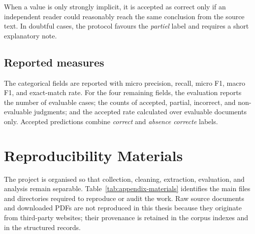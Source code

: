 \documentclass[
11pt,
english,
singlespacing,
headsepline,
]{MastersDoctoralThesis}
\begin{document}
When a value is only strongly implicit, it is accepted as correct only if an
independent reader could reasonably reach the same conclusion from the source
text. In doubtful cases, the protocol favours the \textit{partiel} label and
requires a short explanatory note.

\section{Reported measures}

The categorical fields are reported with micro precision, recall, micro F1,
macro F1, and exact-match rate. For the four remaining fields, the evaluation
reports the number of evaluable cases; the counts of accepted, partial,
incorrect, and non-evaluable judgments; and the accepted rate calculated over
evaluable documents only. Accepted predictions combine \textit{correct} and
\textit{absence correcte} labels.

\chapter{Reproducibility Materials}

The project is organised so that collection, cleaning, extraction, evaluation,
and analysis remain separable. Table~\ref{tab:appendix-materials} identifies
the main files and directories required to reproduce or audit the work. Raw
source documents and downloaded PDFs are not reproduced in this thesis because
they originate from third-party websites; their provenance is retained in the
corpus indexes and in the structured records.
\end{document}
